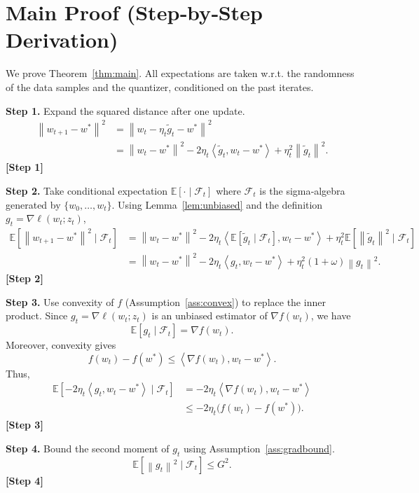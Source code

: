 \documentclass{article}
\newcommand{\E}{\mathbb{E}}
\newcommand{\norm}[1]{\left\|#1\right\|}
\newcommand{\ip}[2]{\left\langle #1,#2\right\rangle}
\begin{document}
\section*{Main Proof (Step‑by‑Step Derivation)}
We prove Theorem~\ref{thm:main}.  
All expectations are taken w.r.t. the randomness of the data samples and the quantizer, conditioned on the past iterates.

\bigskip
\noindent\textbf{Step 1.} Expand the squared distance after one update.
\begin{align}
\norm{w_{t+1}-w^{*}}^{2}
&= \norm{w_{t}-\eta_{t}\tilde g_{t}-w^{*}}^{2} \nonumber\\
&= \norm{w_{t}-w^{*}}^{2}
   -2\eta_{t}\ip{\tilde g_{t}}{w_{t}-w^{*}}
   +\eta_{t}^{2}\norm{\tilde g_{t}}^{2}. \tag{2}
\end{align}
\noindent\textbf{[Step 1]}

\bigskip
\noindent\textbf{Step 2.} Take conditional expectation $\E[\cdot\mid\mathcal{F}_{t}]$ where $\mathcal{F}_{t}$ is the sigma‑algebra generated by $\{w_{0},\dots,w_{t}\}$. Using Lemma~\ref{lem:unbiased} and the definition $g_{t}=\nabla\ell(w_{t};z_{t})$,
\begin{align}
\E\!\left[\norm{w_{t+1}-w^{*}}^{2}\mid\mathcal{F}_{t}\right]
&= \norm{w_{t}-w^{*}}^{2}
   -2\eta_{t}\ip{\E[\tilde g_{t}\mid\mathcal{F}_{t}]}{w_{t}-w^{*}}
   +\eta_{t}^{2}\E\!\left[\norm{\tilde g_{t}}^{2}\mid\mathcal{F}_{t}\right] \nonumber\\
&= \norm{w_{t}-w^{*}}^{2}
   -2\eta_{t}\ip{g_{t}}{w_{t}-w^{*}}
   +\eta_{t}^{2}(1+\omega)\norm{g_{t}}^{2}. \tag{3}
\end{align}
\noindent\textbf{[Step 2]}

\bigskip
\noindent\textbf{Step 3.} Use convexity of $f$ (Assumption~\ref{ass:convex}) to replace the inner product.
Since $g_{t}=\nabla\ell(w_{t};z_{t})$ is an unbiased estimator of $\nabla f(w_{t})$, we have
\[
\E[g_{t}\mid\mathcal{F}_{t}]=\nabla f(w_{t}).
\]
Moreover, convexity gives
\[
f(w_{t})-f(w^{*})\le \ip{\nabla f(w_{t})}{w_{t}-w^{*}}.
\]
Thus,
\begin{align}
\E\!\left[-2\eta_{t}\ip{g_{t}}{w_{t}-w^{*}}\mid\mathcal{F}_{t}\right]
&= -2\eta_{t}\ip{\nabla f(w_{t})}{w_{t}-w^{*}} \nonumber\\
&\le -2\eta_{t}\bigl(f(w_{t})-f(w^{*})\bigr). \tag{4}
\end{align}
\noindent\textbf{[Step 3]}

\bigskip
\noindent\textbf{Step 4.} Bound the second moment of $g_{t}$ using Assumption~\ref{ass:gradbound}.
\[
\E\!\left[\norm{g_{t}}^{2}\mid\mathcal{F}_{t}\right]\le G^{2}. \tag{5}
\]
\noindent\textbf{[Step 4]}
\end{document}
